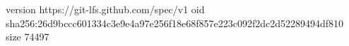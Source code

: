 version https://git-lfs.github.com/spec/v1
oid sha256:26d9bccc601334c3e9e4a97e256f18e68f857e223c092f2dc2d52289494df810
size 74497
